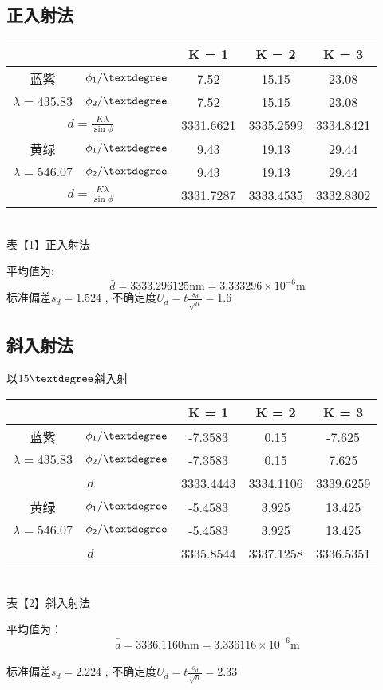 \documentclass[8pt,a4paper,nocap]{ctexart}
\begin{document}
		\subsection{正入射法}\begin{center}
			
		\begin{tabular}{ |c |c| c| c| c| }\hline
		 \multicolumn{2}{|c|}{} & K = 1	& K = 2	& K = 3\\ \hline
		蓝紫&\(\phi_1/\textdegree\) & 7.52  & 15.15  & 23.08 \\ \cline{2-5}
		\(\lambda = 435.83\) &\(\phi_2/\textdegree\) &  7.52 & 15.15 & 23.08\\ \hline 
		 \multicolumn{2}{|c|}{\(d = \frac{K\lambda}{\sin\phi}\)} &3331.6621& 3335.2599& 3334.8421\\ \hline
		黄绿&\(\phi_1/\textdegree\) &  9.43 & 19.13 & 29.44 \\ \cline{2-5}
		 \(\lambda = 546.07\)& \(\phi_2/\textdegree\) & 9.43 & 19.13 & 29.44 \\ \hline
		 \multicolumn{2}{|c|}{\(d = \frac{K\lambda}{\sin\phi}\)} & 3331.7287 & 3333.4535 & 3332.8302\\ \hline
		 \end{tabular}\\ 
		 {\footnotesize 表【1】正入射法}
		\end{center}
		平均值为:
		\[\bar{d} = 3333.296125 \mathrm{nm} = 3.333296 \times10^{-6} \mathrm{m}\]
		标准偏差\(s_d = 1.524\) , 不确定度\(\displaystyle U_d = t\frac{s_d}{\sqrt{n}} = 1.6\)
		\subsection{斜入射法}
		以\(15\textdegree\)斜入射
	\begin{center}
			\begin{tabular}{ |c |c| c| c| c| }\hline
			 \multicolumn{2}{|c|}{} & K = 1	& K = 2	& K = 3\\ \hline
			蓝紫&\(\phi_1/\textdegree\) & -7.3583	& 0.15 & -7.625  \\ \cline{2-5}
		\(\lambda = 435.83\) &\(\phi_2/\textdegree\) &-7.3583 & 0.15 & 7.625 \\ \hline 
		\multicolumn{2}{|c|}{\(d\)} & 3333.4443 & 3334.1106 & 3339.6259 \\ \hline
		黄绿&\(\phi_1/\textdegree\) & -5.4583	& 3.925 & 13.425  \\ \cline{2-5}
		 \(\lambda = 546.07\)& \(\phi_2/\textdegree\) &-5.4583 & 3.925 & 13.425 \\ \hline 
		\multicolumn{2}{|c|}{\(d\)} & 3335.8544 & 3337.1258 & 3336.5351 \\ \hline
		\end{tabular}\\
		{\footnotesize 表【2】斜入射法}
	\end{center}
		平均值为：
			\[\bar{d} = 3336.1160 \mathrm{nm} = 3.336116 \times10^{-6} \mathrm{m}\]\\
		标准偏差\(s_d = 2.224\) , 不确定度\(\displaystyle U_d = t\frac{s_d}{\sqrt{n}} = 2.33\)
\end{document}
